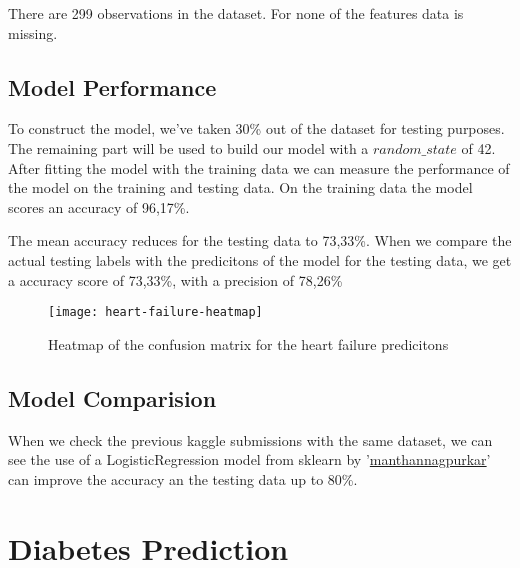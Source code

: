 \noindent There are 299 observations in the dataset. For none of the features data is missing.

\subsection{Model Performance}

To construct the model, we've taken 30\% out of the dataset for testing purposes. The remaining part will be used to build our model with a $random\_state$ of 42. After fitting the model with the training data we can measure the performance of the model on the training and testing data. On the training data the model scores an accuracy of 96,17\%.

The mean accuracy reduces for the testing data to 73,33\%. When we compare the actual testing labels with the predicitons of the model for the testing data, we get a accuracy score of 73,33\%, with a precision of 78,26\%

\begin{figure}[t]
  \begin{center}
    \texttt{[image: heart-failure-heatmap]}
    \caption{Heatmap of the confusion matrix for the heart failure predicitons}
  \end{center}
\end{figure}


\subsection{Model Comparision}

When we check the previous kaggle submissions with the same dataset, we can see the use of a LogisticRegression model from sklearn by '\href{https://www.kaggle.com/manthannagpurkar/heart-failure-prediction}{manthannagpurkar}' can improve the accuracy an the testing data up to 80\%.


\section{Diabetes Prediction}
\newcommand{\linkLogisticRegression}{https://scikit-learn.org/stable/modules/generated/sklearn.linear\_model.LogisticRegression.html}
\newcommand{\linkGaussianNB}{https://scikit-learn.org/stable/modules/generated/sklearn.naive\_bayes.GaussianNB.html?highlight=gaussiannb}
\newcommand{\linkRandomForestClassifier}{https://scikit-learn.org/stable/modules/generated/sklearn.ensemble.RandomForestClassifier.html?highlight=randomforestclassifier}




